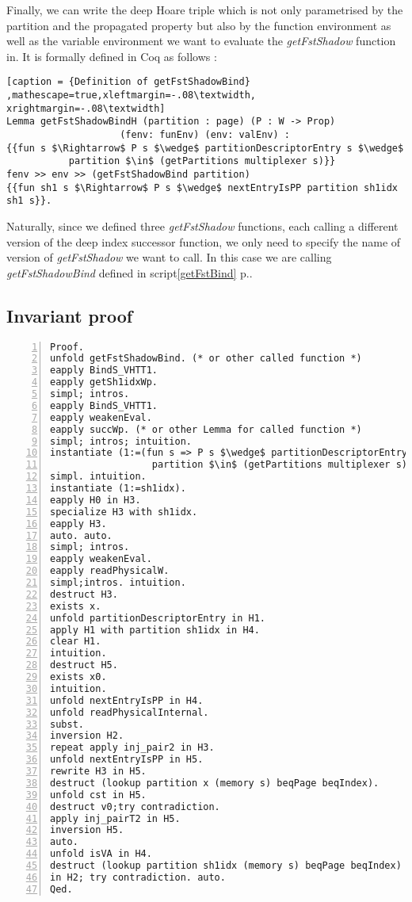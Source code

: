 Finally, we can write the deep Hoare triple which is not only parametrised by the partition and the propagated property but also by the function environment as well as the variable environment we want to evaluate the \textit{getFstShadow} function in. It is formally defined in Coq as follows : 
\begin{lstlisting}[caption = {Definition of getFstShadowBind} ,mathescape=true,xleftmargin=-.08\textwidth,
xrightmargin=-.08\textwidth]
Lemma getFstShadowBindH (partition : page) (P : W -> Prop) 
	                (fenv: funEnv) (env: valEnv) :
{{fun s $\Rightarrow$ P s $\wedge$ partitionDescriptorEntry s $\wedge$ 
           partition $\in$ (getPartitions multiplexer s)}}
fenv >> env >> (getFstShadowBind partition) 
{{fun sh1 s $\Rightarrow$ P s $\wedge$ nextEntryIsPP partition sh1idx sh1 s}}.
\end{lstlisting} \vspace{4pt}
Naturally, since we defined three \textit{getFstShadow} functions, each calling a different version of the deep index successor function, we only need to specify the name of version of \textit{getFstShadow} we want to  call. In this case we are calling \textit{getFstShadowBind} defined in script\ref{getFstBind} p.\pageref{getFstBind}.


\subsection{Invariant proof}
\begin{lstlisting}[caption = {proof of the getFstShadow invariant},xleftmargin=-.08\textwidth,
xrightmargin=-.08\textwidth,mathescape=true,numbers=left]
Proof.
unfold getFstShadowBind. (* or other called function *)
eapply BindS_VHTT1.
eapply getSh1idxWp.
simpl; intros.
eapply BindS_VHTT1.
eapply weakenEval.
eapply succWp. (* or other Lemma for called function *)
simpl; intros; intuition.
instantiate (1:=(fun s => P s $\wedge$ partitionDescriptorEntry s $\wedge$ 
                  partition $\in$ (getPartitions multiplexer s))).
simpl. intuition.
instantiate (1:=sh1idx).
eapply H0 in H3.
specialize H3 with sh1idx.
eapply H3.
auto. auto.
simpl; intros.
eapply weakenEval.
eapply readPhysicalW.
simpl;intros. intuition.
destruct H3.
exists x.
unfold partitionDescriptorEntry in H1.
apply H1 with partition sh1idx in H4.
clear H1.
intuition.
destruct H5.
exists x0.
intuition.
unfold nextEntryIsPP in H4.
unfold readPhysicalInternal.
subst.
inversion H2.
repeat apply inj_pair2 in H3.
unfold nextEntryIsPP in H5.
rewrite H3 in H5.
destruct (lookup partition x (memory s) beqPage beqIndex).
unfold cst in H5.
destruct v0;try contradiction.
apply inj_pairT2 in H5.
inversion H5.
auto.
unfold isVA in H4.
destruct (lookup partition sh1idx (memory s) beqPage beqIndex) 
in H2; try contradiction. auto.
Qed.
\end{lstlisting} \vspace{4pt}

